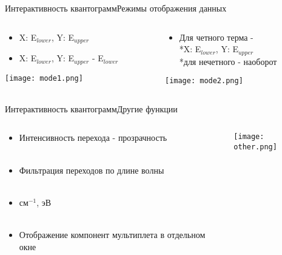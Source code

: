 \documentclass{beamer}
\begin{document}
\begin{frame}{Интерактивность квантограмм}{Режимы отображения данных}
\begin{columns}
    \begin{column}{0.5\textwidth}
    \begin{itemize}
        \item X: E$_{lower}$, Y: E$_{upper}$
        \item  X: E$_{lower}$, Y: E$_{upper}$ - E$_{lower}$
    \end{itemize}
         \texttt{[image: mode1.png]}
    \end{column}
    \begin{column}{0.5\textwidth}
      \begin{itemize}
        \item Для четного терма - \\*X: E$_{lower}$, Y: E$_{upper}$
        \\*для нечетного - наоборот
    \end{itemize}
      \texttt{[image: mode2.png]}
    \end{column}
  \end{columns}
\end{frame}

\begin{frame}{Интерактивность квантограмм}{Другие функции}
   \begin{columns}
    \begin{column}{0.25\textwidth}
        \begin{block}{}
             \scriptsize\begin{itemize}
                \item Интенсивность перехода - прозрачность\\~\\
                \item Фильтрация переходов по длине волны\\~\\
                \item см$^{-1}$, эВ\\~\\
                \item Отображение компонент мультиплета в отдельном окне
            \end{itemize}
            \normalsize
        \end{block}
    \end{column}
    \begin{column}{0.75\textwidth}
    \texttt{[image: other.png]}
    \end{column}
  \end{columns}
\end{frame}
\end{document}
